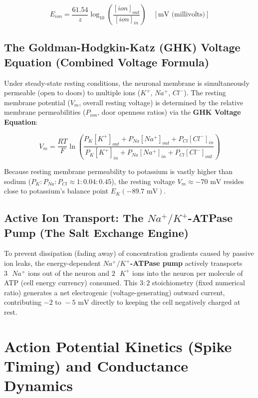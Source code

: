 \documentclass[10pt,journal,compsoc,onecolumn]{IEEEtran}
\begin{document}
\begin{equation}
E_{ion} = \frac{61.54}{z} \log_{10} \left( \frac{[ion]_{out}}{[ion]_{in}} \right) \quad [\text{mV (millivolts)}]
\end{equation}

\subsection{The Goldman-Hodgkin-Katz (GHK) Voltage Equation (Combined Voltage Formula)}

Under steady-state resting conditions, the neuronal membrane is simultaneously permeable (open to doors) to multiple ions ($K^+$, $Na^+$, $Cl^-$). The resting membrane potential ($V_m$, overall resting voltage) is determined by the relative membrane permeabilities ($P_{ion}$, door openness ratios) via the \textbf{GHK Voltage Equation}:

\begin{equation}
V_m = \frac{RT}{F} \ln \left( \frac{P_{K}[K^+]_{out} + P_{Na}[Na^+]_{out} + P_{Cl}[Cl^-]_{in}}{P_{K}[K^+]_{in} + P_{Na}[Na^+]_{in} + P_{Cl}[Cl^-]_{out}} \right)
\end{equation}

Because resting membrane permeability to potassium is vastly higher than sodium ($P_K : P_{Na} : P_{Cl} \approx 1 : 0.04 : 0.45$), the resting voltage $V_m \approx -70\text{ mV}$ resides close to potassium's balance point $E_K (-89.7\text{ mV})$.

\subsection{Active Ion Transport: The $Na^+/K^+$-ATPase Pump (The Salt Exchange Engine)}

To prevent dissipation (fading away) of concentration gradients caused by passive ion leaks, the energy-dependent \textbf{$Na^+/K^+$-ATPase pump} actively transports $3\text{ }Na^+$ ions out of the neuron and $2\text{ }K^+$ ions into the neuron per molecule of ATP (cell energy currency) consumed. This $3:2$ stoichiometry (fixed numerical ratio) generates a net electrogenic (voltage-generating) outward current, contributing $-2\text{ to }-5\text{ mV}$ directly to keeping the cell negatively charged at rest.

\section{Action Potential Kinetics (Spike Timing) and Conductance Dynamics}
\label{sec:action_potential}
\end{document}

